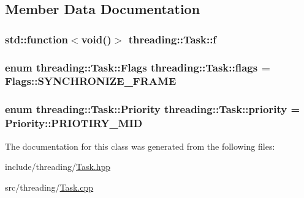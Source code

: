 \subsection{Member Data Documentation}
\hypertarget{classthreading_1_1Task_a3124f087b332f0d041d17c4656a4562a}{
\subsubsection[{f}]{\setlength{\rightskip}{0pt plus 5cm}std\-::function$<$void()$>$ threading\-::\-Task\-::f}}\label{classthreading_1_1Task_a3124f087b332f0d041d17c4656a4562a}
\hypertarget{classthreading_1_1Task_aaa114552c0b8f31aba9eda8d49ec3f83}{
\subsubsection[{flags}]{\setlength{\rightskip}{0pt plus 5cm}enum {\bf threading\-::\-Task\-::\-Flags}  threading\-::\-Task\-::flags = Flags\-::\-S\-Y\-N\-C\-H\-R\-O\-N\-I\-Z\-E\-\_\-\-F\-R\-A\-M\-E}}\label{classthreading_1_1Task_aaa114552c0b8f31aba9eda8d49ec3f83}
\hypertarget{classthreading_1_1Task_a0195384291445a4d3ddab43d125efcc6}{
\subsubsection[{priority}]{\setlength{\rightskip}{0pt plus 5cm}enum {\bf threading\-::\-Task\-::\-Priority}  threading\-::\-Task\-::priority = Priority\-::\-P\-R\-I\-O\-T\-I\-R\-Y\-\_\-\-M\-I\-D}}\label{classthreading_1_1Task_a0195384291445a4d3ddab43d125efcc6}


The documentation for this class was generated from the following files\-:\begin{DoxyCompactItemize}
\item 
include/threading/\hyperlink{Task_8hpp}{Task.\-hpp}\item 
src/threading/\hyperlink{Task_8cpp}{Task.\-cpp}\end{DoxyCompactItemize}
